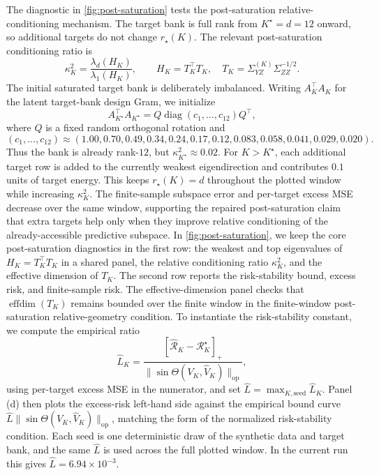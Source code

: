 The diagnostic in \cref{fig:post-saturation} tests the post-saturation
relative-conditioning mechanism. The target bank is full rank from
$K^\star=d=12$ onward, so
additional targets do not change $r_\star(K)$. The relevant post-saturation
conditioning ratio is
\[
    \kappa_K^2
    =
    \frac{\lambda_d(H_K)}{\lambda_1(H_K)},
    \qquad
    H_K=T_K^\top T_K,\quad
    T_K=\Sigma_{YZ}^{(K)}\Sigma_{ZZ}^{-1/2}.
\]
The initial saturated target bank is deliberately imbalanced. Writing
$A_K^\top A_K$ for the latent target-bank design Gram, we initialize
\[
    A_{K^\star}^\top A_{K^\star}
    =
    Q\operatorname{diag}(c_1,\ldots,c_{12})Q^\top,
\]
where $Q$ is a fixed random orthogonal rotation and
\[
    (c_1,\ldots,c_{12})
    \approx
    (1.00,0.70,0.49,0.34,0.24,0.17,0.12,0.083,0.058,0.041,0.029,0.020).
\]
Thus the bank is already rank-$12$, but
$\kappa_{K^\star}^2\approx 0.02$. For $K>K^\star$, each additional target row
is added to the currently weakest eigendirection and contributes $0.1$ units of
target energy. This keeps $r_\star(K)=d$ throughout the plotted window while
increasing $\kappa_K^2$. The finite-sample subspace error and per-target excess
MSE decrease over the same window, supporting the repaired post-saturation
claim that extra targets help only when they improve relative conditioning of
the already-accessible predictive subspace.
In \cref{fig:post-saturation}, we keep the core post-saturation diagnostics in
the first row: the weakest and top eigenvalues of $H_K=T_K^\top T_K$ in a
shared panel, the relative conditioning ratio $\kappa_K^2$, and the effective
dimension of $T_K$. The
second row reports the risk-stability bound, excess risk, and finite-sample
risk. The
effective-dimension panel checks that
$\operatorname{effdim}(T_K)$ remains bounded over the finite
window in the finite-window post-saturation relative-geometry condition. To instantiate the
risk-stability constant, we compute the empirical ratio
\[
    \widehat L_K
    =
    \frac{[\widehat{\mathcal R}_K-\mathcal R_K^\star]_+}
    {\|\sin\Theta(V_K,\widehat V_K)\|_{\mathrm{op}}},
\]
using per-target excess MSE in the numerator, and set
$\widehat L=\max_{K,\mathrm{seed}}\widehat L_K$. Panel (d) then plots the
excess-risk left-hand side against the empirical bound curve
$\widehat L\|\sin\Theta(V_K,\widehat V_K)\|_{\mathrm{op}}$, matching the form of
the normalized risk-stability condition. Each seed is one
deterministic draw of the synthetic data and target bank, and the same
$\widehat L$ is used across the full plotted window. In the current run this
gives $\widehat L=6.94\times10^{-3}$.


